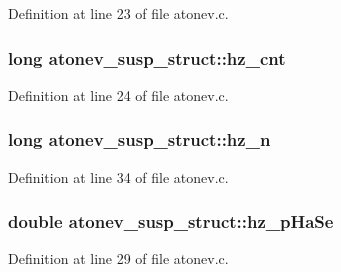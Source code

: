 Definition at line 23 of file atonev.\+c.

\subsubsection[{\texorpdfstring{hz\+\_\+cnt}{hz_cnt}}]{\setlength{\rightskip}{0pt plus 5cm}long atonev\+\_\+susp\+\_\+struct\+::hz\+\_\+cnt}\hypertarget{structatonev__susp__struct_a944e692b3606d40be7a83371baaaecfb}{}\label{structatonev__susp__struct_a944e692b3606d40be7a83371baaaecfb}


Definition at line 24 of file atonev.\+c.

\subsubsection[{\texorpdfstring{hz\+\_\+n}{hz_n}}]{\setlength{\rightskip}{0pt plus 5cm}long atonev\+\_\+susp\+\_\+struct\+::hz\+\_\+n}\hypertarget{structatonev__susp__struct_a2ff4eaf67868342c8dfa6129336af098}{}\label{structatonev__susp__struct_a2ff4eaf67868342c8dfa6129336af098}


Definition at line 34 of file atonev.\+c.

\subsubsection[{\texorpdfstring{hz\+\_\+p\+Ha\+Se}{hz_pHaSe}}]{\setlength{\rightskip}{0pt plus 5cm}double atonev\+\_\+susp\+\_\+struct\+::hz\+\_\+p\+Ha\+Se}\hypertarget{structatonev__susp__struct_a68cc3ede3061bf6514fabde3ee02338c}{}\label{structatonev__susp__struct_a68cc3ede3061bf6514fabde3ee02338c}


Definition at line 29 of file atonev.\+c.

